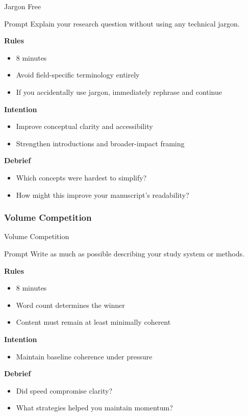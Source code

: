 \documentclass{beamer}
\begin{document}
\begin{frame}{Jargon Free}
\begin{block}{Prompt}
Explain your research question without using any technical jargon.
\end{block}

\vspace{0.8em}
\textbf{Rules}
\begin{itemize}
    \item 8 minutes
    \item Avoid field-specific terminology entirely
    \item If you accidentally use jargon, immediately rephrase and continue
\end{itemize}

\textbf{Intention}
\begin{itemize}
    \item Improve conceptual clarity and accessibility
    \item Strengthen introductions and broader-impact framing
\end{itemize}

\textbf{Debrief}
\begin{itemize}
    \item Which concepts were hardest to simplify?
    \item How might this improve your manuscript's readability?
\end{itemize}
\end{frame}

\subsubsection{Volume Competition}

\begin{frame}{Volume Competition}
\begin{block}{Prompt}
Write as much as possible describing your study system or methods.
\end{block}

\vspace{0.8em}
\textbf{Rules}
\begin{itemize}
    \item 8 minutes
    \item Word count determines the winner
    \item Content must remain at least minimally coherent
\end{itemize}

\textbf{Intention}
\begin{itemize}
    \item Maintain baseline coherence under pressure
\end{itemize}

\textbf{Debrief}
\begin{itemize}
    \item Did speed compromise clarity?
    \item What strategies helped you maintain momentum?
\end{itemize}
\end{frame}
\end{document}

